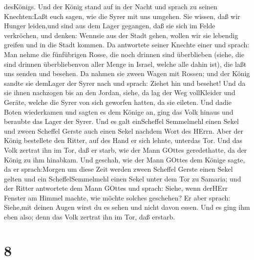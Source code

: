 desKönigs.  Und der König stand auf in der Nacht und sprach
zu seinen Knechten:Laßt euch sagen, wie die Syrer mit uns umgehen. Sie
wissen, daß wir Hunger leiden,und sind aus dem Lager gegangen, daß sie
sich im Felde verkröchen, und denken: Wennsie aus der Stadt gehen,
wollen wir sie lebendig greifen und in die Stadt kommen. 
Da antwortete seiner Knechte einer und sprach: Man nehme die fünfübrigen
Rosse, die noch drinnen sind überblieben (siehe, die sind drinnen
überbliebenvon aller Menge in Israel, welche alle dahin ist), die laßt
uns senden und besehen.  Da nahmen sie zween Wagen mit
Rossen; und der König sandte sie demLager der Syrer nach und sprach:
Ziehet hin und besehet!  Und da sie ihnen nachzogen bis an
den Jordan, siehe, da lag der Weg vollKleider und Geräte, welche die
Syrer von sich geworfen hatten, da sie eileten. Und dadie Boten
wiederkamen und sagten es dem Könige an,  ging das Volk
hinaus und beraubte das Lager der Syrer. Und es galt einScheffel
Semmelmehl einen Sekel und zween Scheffel Gerste auch einen Sekel
nachdem Wort des HErrn.  Aber der König bestellete den
Ritter, auf des Hand er sich lehnte, unterdas Tor. Und das Volk zertrat
ihn im Tor, daß er starb, wie der Mann GOttes geredethatte, da der König
zu ihm hinabkam.  Und geschah, wie der Mann GOttes dem
Könige sagte, da er sprach:Morgen um diese Zeit werden zween Scheffel
Gerste einen Sekel gelten und ein ScheffelSemmelmehl einen Sekel unter
dem Tor zu Samaria;  und der Ritter antwortete dem Mann
GOttes und sprach: Siehe, wenn derHErr Fenster am Himmel machte, wie
möchte solches geschehen? Er aber sprach: Siehe,mit deinen Augen wirst
du es sehen und nicht davon essen.  Und es ging ihm eben
also; denn das Volk zertrat ihn im Tor, daß erstarb.

\hypertarget{section-7}{%
\section{8}\label{section-7}}

